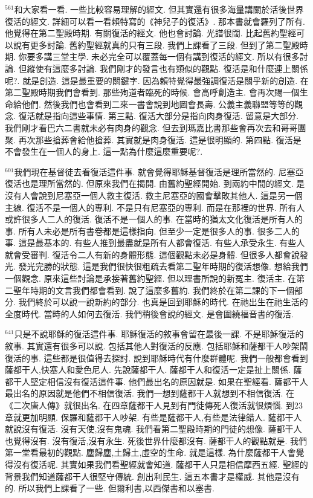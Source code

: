 \documentclass{book}
\begin{document}
$^{561}$和大家看一看.
一些比較容易理解的經文.
但其實還有很多海量講關於活後世界復活的經文.
詳細可以看一看賴特寫的《神兒子的復活》.
那本書就會羅列了所有.
他覺得在第二聖殿時期.
有關復活的經文.
他也會討論.
光譜很闊.
比起舊約聖經可以說有更多討論.
舊約聖經就真的只有三段.
我們上課看了三段.
但到了第二聖殿時期.
你要多講三堂主學.
未必完全可以覆蓋每一個有講到復活的經文.
所以有很多討論.
但縱使有這麼多討論.
我們剛才的發言也有類似的觀點.
復活是和什麼連上關係呢?.
就是創造.
這是最重要的關鍵字.
因為賴特覺得最強調復活是關乎新的創造.
在第二聖殿時期我們會看到.
那些殉道者臨死的時候.
會高呼創造主.
會再次賜一個生命給他們.
然後我們也會看到二來一書會說到地圖會長壽.
公義主義聯盟等等的觀念.
復活就是指向這些事情.
第三點.
復活大部分是指向肉身復活.
留意是大部分.
我們剛才看巴六二書就未必有肉身的觀念.
但去到瑪嘉比書那些會再次去和哥哥團聚.
再次那些搶葬會給他搶葬.
其實就是肉身復活.
這是很明顯的.
第四點.
復活是不會發生在一個人的身上.
這一點為什麼這麼重要呢?.

$^{601}$我們現在基督徒去看復活這件事.
就會覺得耶穌基督復活是理所當然的.
尼塞亞復活也是理所當然的.
但原來我們在揭開.
由舊約聖經開始.
到兩約中間的經文.
是沒有人會說到尼塞亞一個人救主復活.
救主尼塞亞的國會擊敗其他人.
這是另一個主線.
復活不是一個人的專利.
不是只有尼塞亞的專利.
而是在那裡的世界.
所有人或許很多人二人的復活.
復活不是一個人的事.
在當時的猶太文化復活是所有人的事.
所有人未必是所有書卷都是這樣指向.
但至少一定是很多人的事.
很多二人的事.
這是最基本的.
有些人推到最盡就是所有人都會復活.
有些人承受永生.
有些人就會受審判.
復活令二人有新的身體形態.
這個觀點未必是身體.
但很多人都會說發光.
發光完勝的狀態.
這是我們很快很粗疏去看第二聖年時期的復活想像.
想給我們一個觀念.
原來這些討論是承接著舊約聖經.
但以理書所說的新冤主.
復活主.
在第二聖年時期的文言我們都會看到.
說了這麼多舊約.
我們終於在第二課的下一個部分.
我們終於可以說一說新約的部分.
也真是回到耶穌的時代.
在祂出生在祂生活的全度時代.
當時的人如何去復活.
我們稍後會說的經文.
是會圍繞福音書的復活.

$^{641}$只是不說耶穌的復活這件事.
耶穌復活的敘事會留在最後一課.
不是耶穌復活的敘事.
其實還有很多可以說.
包括其他人對復活的反應.
包括耶穌和薩都干人吵架鬧復活的事.
這些都是很值得去探討.
說到耶穌時代有什麼群體呢.
我們一般都會看到薩都干人,快塞人和愛色尼人.
先說薩都干人.
薩都干人和復活一定是扯上關係.
薩都干人堅定相信沒有復活這件事.
他們最出名的原因就是.
如果在聖經看.
薩都干人最出名的原因就是他們不相信復活.
我們一想到薩都干人就想到不相信復活.
在《二次唐人傳》就很出名.
在四章薩都干人見到有門徒傳死人復活就很煩惱.
到23章就更加明顯.
保羅和薩都干人吵架.
有些是薩都干人,有些是法律錯人.
薩都干人就說沒有復活.
沒有天使,沒有鬼魂.
我們看第二聖殿時期的門徒的想像.
薩都干人也覺得沒有.
沒有復活,沒有永生.
死後世界什麼都沒有.
薩都干人的觀點就是.
我們第一堂看最初的觀點.
塵歸塵,土歸土,虛空的生命.
就是這樣.
為什麼薩都干人會覺得沒有復活呢.
其實如果我們看聖經就會知道.
薩都干人只是相信摩西五經.
聖經的背景我們知道薩都干人很堅守傳統.
創出利民生.
這五本書才是權威.
其他是沒有的.
所以我們上課看了一些.
但爾利書,以西傑書和以塞書.
\end{document}
